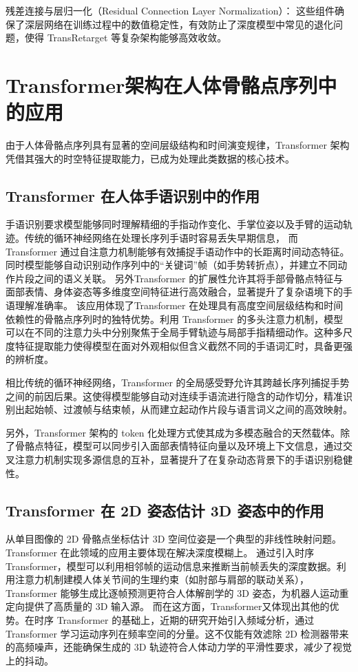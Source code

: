 残差连接与层归一化（Residual Connection  Layer Normalization）：
这些组件确保了深层网络在训练过程中的数值稳定性，有效防止了深度模型中常见的退化问题，使得 TransRetarget 等复杂架构能够高效收敛。

\section{Transformer架构在人体骨骼点序列中的应用}
由于人体骨骼点序列具有显著的空间层级结构和时间演变规律，Transformer 架构凭借其强大的时空特征提取能力，已成为处理此类数据的核心技术。

\subsection{Transformer 在人体手语识别中的作用}
手语识别要求模型能够同时理解精细的手指动作变化、手掌位姿以及手臂的运动轨迹。传统的循环神经网络在处理长序列手语时容易丢失早期信息，
而 Transformer 通过自注意力机制能够有效捕捉手语动作中的长距离时间动态特征。同时模型能够自动识别动作序列中的“关键词”帧（如手势转折点），并建立不同动作片段之间的语义关联。
另外Transformer 的扩展性允许其将手部骨骼点特征与面部表情、身体姿态等多维度空间特征进行高效融合，显著提升了复杂语境下的手语理解准确率\cite{camgozSignLanguageTransformers2020a}。
该应用体现了Transformer 在处理具有高度空间层级结构和时间依赖性的骨骼点序列时的独特优势。利用 Transformer 的多头注意力机制，模型可以在不同的注意力头中分别聚焦于全局手臂轨迹与局部手指精细动作。这种多尺度特征提取能力使得模型在面对外观相似但含义截然不同的手语词汇时，具备更强的辨析度。

相比传统的循环神经网络，Transformer 的全局感受野允许其跨越长序列捕捉手势之间的前因后果。这使得模型能够自动对连续手语流进行隐含的动作切分，精准识别出起始帧、过渡帧与结束帧，从而建立起动作片段与语言词义之间的高效映射。

另外，Transformer 架构的 token 化处理方式使其成为多模态融合的天然载体。除了骨骼点特征，模型可以同步引入面部表情特征向量以及环境上下文信息，通过交叉注意力机制实现多源信息的互补，显著提升了在复杂动态背景下的手语识别稳健性。
\subsection{Transformer 在 2D 姿态估计 3D 姿态中的作用}
从单目图像的 2D 骨骼点坐标估计 3D 空间位姿是一个典型的非线性映射问题。Transformer 在此领域的应用主要体现在解决深度模糊上。
通过引入时序 Transformer，模型可以利用相邻帧的运动信息来推断当前帧丢失的深度数据。利用注意力机制建模人体关节间的生理约束（如肘部与肩部的联动关系），Transformer 能够生成比逐帧预测更符合人体解剖学的 3D 姿态，为机器人运动重定向提供了高质量的 3D 输入源\cite{zheng3dHumanPose2021}\cite{zhaoPoseformerv2ExploringFrequency2023}。
而在这方面，Transformer又体现出其他的优势。在时序 Transformer 的基础上，近期的研究开始引入频域分析，通过 Transformer 学习运动序列在频率空间的分量。这不仅能有效滤除 2D 检测器带来的高频噪声，还能确保生成的 3D 轨迹符合人体动力学的平滑性要求，减少了视觉上的抖动。

